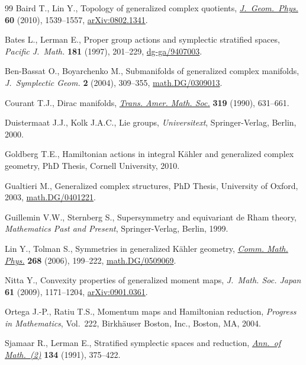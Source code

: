 \documentclass[11pt]{article}
\numberwithin{equation}{section}
\begin{document}
\begin{thebibliography}{99}
Baird T., Lin Y.,
Topology of generalized complex quotients,
\href{http://dx.doi.org/10.1016/j.geomphys.2010.05.002}{{\it J.~Geom.~Phys.}} {\bf 60} (2010), 1539--1557,
\href{http://arxiv.org/abs/0802.1341}{arXiv:0802.1341}.

Bates L., Lerman E.,
Proper group actions and symplectic stratif\/ied spaces,
{\it Pacific J.~Math.} {\bf 181} (1997), 201--229,
\href{http://arxiv.org/abs/dg-ga/9407003}{dg-ga/9407003}.

Ben-Bassat O., Boyarchenko M.,
Submanifolds of generalized complex manifolds,
{\it J.~Symplectic Geom.} {\bf 2} (2004), 309--355,
\href{http://arxiv.org/abs/math.DG/0309013}{math.DG/0309013}.

Courant T.J.,
Dirac manifolds,
\href{http://dx.doi.org/10.2307/2001258}{{\it Trans. Amer. Math. Soc.}} {\bf 319} (1990), 631--661.

Duistermaat J.J., Kolk J.A.C.,
Lie groups, {\it Universitext}, Springer-Verlag, Berlin, 2000.

Goldberg T.E.,
Hamiltonian actions in integral K\"ahler and generalized complex geometry,
PhD Thesis, Cornell University, 2010.

Gualtieri M.,
Generalized complex structures,
PhD Thesis,
University of Oxford,
2003,
\href{http://arxiv.org/abs/math.DG/0401221}{math.DG/0401221}.

Guillemin V.W., Sternberg S.,
Supersymmetry and equivariant de Rham theory,
{\it Mathematics Past and Present},
Springer-Verlag,
Berlin,
1999.

Lin Y., Tolman S.,
Symmetries in generalized K\"ahler geometry,
\href{http://dx.doi.org/10.1007/s00220-006-0096-z}{{\it Comm. Math. Phys.}} {\bf 268} (2006), 199--222,
\href{http://arxiv.org/abs/math.DG/0509069}{math.DG/0509069}.

Nitta Y.,
Convexity properties of generalized moment maps,
{\it J.~Math. Soc. Japan} {\bf 61} (2009), 1171--1204,
\href{http://arxiv.org/abs/0901.0361}{arXiv:0901.0361}.

Ortega J.-P., Ratiu T.S.,
Momentum maps and Hamiltonian reduction,
{\it Progress in Mathematics}, Vol.~222,
Birkh\"auser Boston, Inc.,
Boston, MA,
2004.

Sjamaar R., Lerman E.,
Stratif\/ied symplectic spaces and reduction,
\href{http://dx.doi.org/10.2307/2944350}{{\it Ann.~of Math.~(2)}} {\bf 134} (1991), 375--422.

\end{thebibliography}
\end{document}
